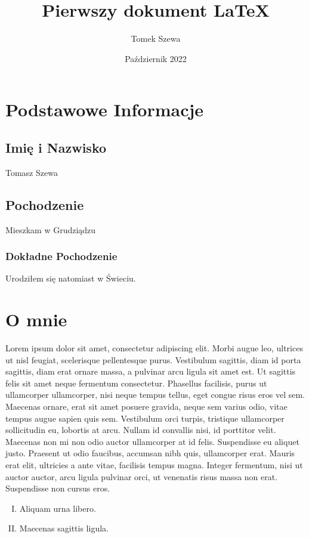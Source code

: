 \documentclass[12pt, letterpaper,titlepage]{article}
\title{Pierwszy dokument LaTeX}
\author{Tomek Szewa}
\date{Październik 2022}
\begin{document}
\maketitle
\section{Podstawowe Informacje}
\subsection{Imię i Nazwisko}
Tomasz Szewa
\subsection{Pochodzenie}
Mieszkam w Grudziądzu
\subsubsection{Dokładne Pochodzenie}
Urodziłem się natomiast w Świeciu.
\section{O mnie}
Lorem ipsum dolor sit amet, consectetur adipiscing elit. Morbi augue leo, ultrices ut nisl feugiat, scelerisque pellentesque purus. Vestibulum sagittis, diam id porta sagittis, diam erat ornare massa, a pulvinar arcu ligula sit amet est. Ut sagittis felis sit amet neque fermentum consectetur. Phasellus facilisis, purus ut ullamcorper ullamcorper, nisi neque tempus tellus, eget congue risus eros vel sem. Maecenas ornare, erat sit amet posuere gravida, neque sem varius odio, vitae tempus augue sapien quis sem. Vestibulum orci turpis, tristique ullamcorper sollicitudin eu, lobortis at arcu. Nullam id convallis nisi, id porttitor velit. Maecenas non mi non odio auctor ullamcorper at id felis. Suspendisse eu aliquet justo. Praesent ut odio faucibus, accumsan nibh quis, ullamcorper erat. Mauris erat elit, ultricies a ante vitae, facilisis tempus magna. Integer fermentum, nisi ut auctor auctor, arcu ligula pulvinar orci, ut venenatis risus massa non erat. Suspendisse non cursus eros. 
\begin{enumerate}[I.]
\item Aliquam urna libero.
\item Maecenas sagittis ligula.
\end{enumerate}
\end{document}
